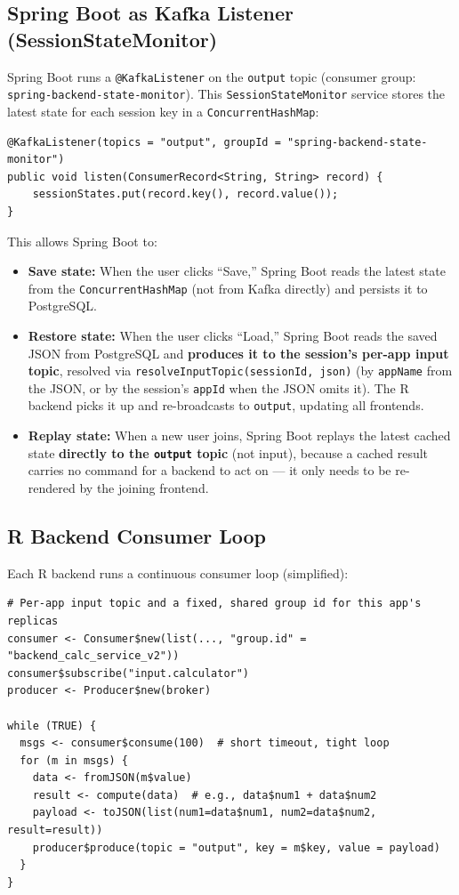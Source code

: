 \documentclass[12pt,a4paper]{article}
\begin{document}
\subsection{Spring Boot as Kafka Listener (SessionStateMonitor)}

Spring Boot runs a \texttt{@KafkaListener} on the \texttt{output} topic (consumer group: \texttt{spring-backend-state-monitor}). This \texttt{SessionStateMonitor} service stores the latest state for each session key in a \texttt{ConcurrentHashMap}:

\begin{verbatim}
@KafkaListener(topics = "output", groupId = "spring-backend-state-monitor")
public void listen(ConsumerRecord<String, String> record) {
    sessionStates.put(record.key(), record.value());
}
\end{verbatim}

This allows Spring Boot to:
\begin{itemize}[nosep]
  \item \textbf{Save state:} When the user clicks ``Save,'' Spring Boot reads the latest state from the \texttt{ConcurrentHashMap} (not from Kafka directly) and persists it to PostgreSQL.
  \item \textbf{Restore state:} When the user clicks ``Load,'' Spring Boot reads the saved JSON from PostgreSQL and \textbf{produces it to the session's per-app input topic}, resolved via \texttt{resolveInputTopic(sessionId, json)} (by \texttt{appName} from the JSON, or by the session's \texttt{appId} when the JSON omits it). The R backend picks it up and re-broadcasts to \texttt{output}, updating all frontends.
  \item \textbf{Replay state:} When a new user joins, Spring Boot replays the latest cached state \textbf{directly to the \texttt{output} topic} (not input), because a cached result carries no command for a backend to act on --- it only needs to be re-rendered by the joining frontend.
\end{itemize}

\subsection{R Backend Consumer Loop}

Each R backend runs a continuous consumer loop (simplified):

\begin{verbatim}
# Per-app input topic and a fixed, shared group id for this app's replicas
consumer <- Consumer$new(list(..., "group.id" = "backend_calc_service_v2"))
consumer$subscribe("input.calculator")
producer <- Producer$new(broker)

while (TRUE) {
  msgs <- consumer$consume(100)  # short timeout, tight loop
  for (m in msgs) {
    data <- fromJSON(m$value)
    result <- compute(data)  # e.g., data$num1 + data$num2
    payload <- toJSON(list(num1=data$num1, num2=data$num2, result=result))
    producer$produce(topic = "output", key = m$key, value = payload)
  }
}
\end{verbatim}
\end{document}
